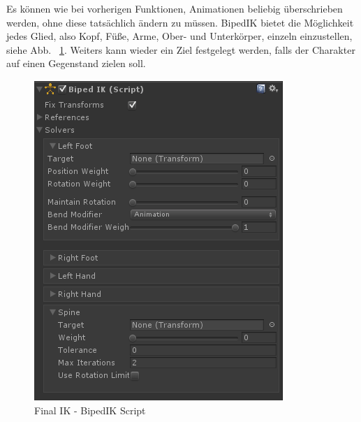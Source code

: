 \begin{itemize}
Es können wie bei vorherigen Funktionen, Animationen beliebig überschrieben werden, ohne diese tatsächlich ändern zu müssen.
BipedIK bietet die Möglichkeit jedes Glied, also Kopf, Füße, Arme, Ober- und Unterkörper, einzeln einzustellen, siehe Abb. ~\ref{fig:finalIK_bipedik_script}.
Weiters kann wieder ein Ziel festgelegt werden, falls der Charakter auf einen Gegenstand zielen soll.
\begin {figure}
    \centering
    \includegraphics[scale=0.8]{pics/finalik_bipedik_script}
    \caption{Final IK - BipedIK Script}
    \label{fig:finalIK_bipedik_script}
\end {figure}
~\cite{FinalIK_BipedIK_2021}


\end{itemize}
